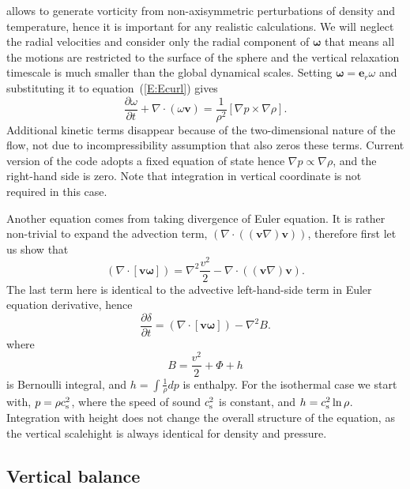 \documentclass[usenatbib,onecolumn]{mnras}
\renewcommand{\vector}[1]{\ensuremath{\mathbf{#1}}}
\newcommand{\pardir}[2]{\ensuremath{\frac{\partial #2}{\partial #1} }}
\begin{document}
allows to generate vorticity from non-axisymmetric perturbations of density
and temperature, hence it is important for any realistic calculations. We will
neglect the radial velocities and consider only the radial component of
$\vector{\omega}$ that means all the motions are restricted to the surface of
the sphere and the vertical relaxation timescale is much smaller than the
global dynamical scales. Setting $\vector{\omega} = \vector{e}_r \omega$ and
substituting it to equation~(\ref{E:Ecurl}) gives
\begin{equation}\label{E:Ecurl:r}
\displaystyle  \pardir{t}{\omega} + \nabla \cdot (\omega \vector{v}) =
\frac{1}{\rho^2}\left[\nabla p \times \nabla \rho \right].
\end{equation}
Additional kinetic terms disappear because of the two-dimensional nature of
the flow, not due to incompressibility assumption that also zeros these
terms. Current version of the code adopts a fixed equation of state hence
$\nabla p \propto \nabla \rho $, and the right-hand side is zero. Note that
integration in vertical coordinate is not required in this case. 

Another equation comes from taking divergence of Euler equation. It is rather
non-trivial to expand the advection term, $(\nabla \cdot
((\vector{v}\nabla)\vector{v}))$, therefore first let us show that
\begin{equation}\label{E:vomega}
\left(\nabla \cdot \left[ \vector{v} \vector{\omega}\right] \right) = 
 \nabla^2\frac{v^2}{2} - \nabla \cdot \left((\vector{v}\nabla)\vector{v}\right).
\end{equation}
The last term here is identical to the advective left-hand-side term in Euler
equation derivative, hence
\begin{equation}\label{E:delta}
\pardir{t}{\delta} = \left(\nabla \cdot \left[ \vector{v}
  \vector{\omega}\right] \right) -  \nabla^2 B.
\end{equation}
where
\begin{equation}\label{E:Bernoulli}
B = \frac{v^2}{2} + \Phi + h
\end{equation}
is Bernoulli integral, and $h = \int \frac{1}{\rho}dp$ is enthalpy. For the
isothermal case we start with, $p =  \rho c_{\rm s}^2$, where the speed of
sound $c_{\rm s}^2$ is constant, and $h= c_{\rm s}^2 \ln\rho$. Integration
with height does not change the overall structure of the equation, as the
vertical scalehight is always identical for density and pressure. 

\subsection{Vertical balance}
\end{document}
